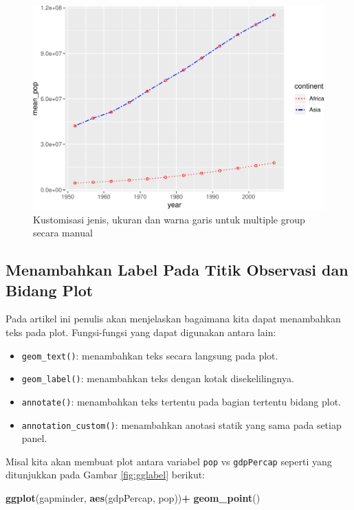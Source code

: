\documentclass[]{book}
\newenvironment{Shaded}{\begin{snugshade}}{\end{snugshade}}
\newcommand{\KeywordTok}[1]{\textcolor[rgb]{0.13,0.29,0.53}{\textbf{#1}}}
\newcommand{\StringTok}[1]{\textcolor[rgb]{0.31,0.60,0.02}{#1}}
\newcommand{\OperatorTok}[1]{\textcolor[rgb]{0.81,0.36,0.00}{\textbf{#1}}}
\newcommand{\NormalTok}[1]{#1}
\providecommand{\tightlist}{%
  \setlength{\itemsep}{0pt}\setlength{\parskip}{0pt}}
\begin{document}
\begin{figure}

{\centering \includegraphics[width=0.7\linewidth]{EnvStat_files/figure-latex/gglty3-1} 

}

\caption{Kustomisasi jenis, ukuran dan warna garis untuk multiple group secara manual}\label{fig:gglty3}
\end{figure}

\subsection{Menambahkan Label Pada Titik Observasi dan Bidang
Plot}\label{menambahkan-label-pada-titik-observasi-dan-bidang-plot}

Pada artikel ini penulis akan menjelaskan bagaimana kita dapat
menambahkan teks pada plot. Fungsi-fungsi yang dapat digunakan antara
lain:

\begin{itemize}
\tightlist
\item
  \texttt{geom\_text()}: menambahkan teks secara langsung pada plot.
\item
  \texttt{geom\_label()}: menambahkan teks dengan kotak disekelilingnya.
\item
  \texttt{annotate()}: menambahkan teks tertentu pada bagian tertentu
  bidang plot.
\item
  \texttt{annotation\_custom()}: menambahkan anotasi statik yang sama
  pada setiap panel.
\end{itemize}

Misal kita akan membuat plot antara variabel \texttt{pop} vs
\texttt{gdpPercap} seperti yang ditunjukkan pada Gambar
\ref{fig:gglabel} berikut:

\begin{Shaded}
\begin{Highlighting}[]
\KeywordTok{ggplot}\NormalTok{(gapminder, }\KeywordTok{aes}\NormalTok{(gdpPercap, pop))}\OperatorTok{+}
\StringTok{  }\KeywordTok{geom_point}\NormalTok{()}
\end{Highlighting}
\end{Shaded}
\end{document}
